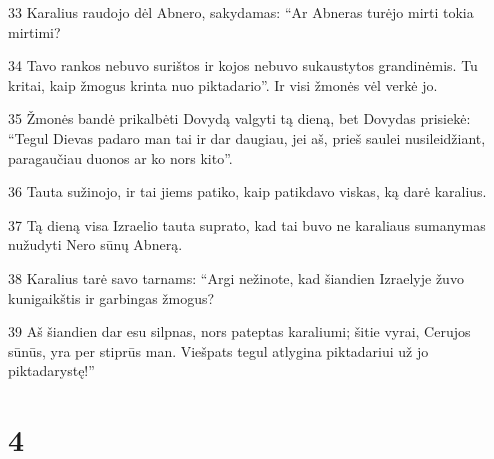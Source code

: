 \par 33 Karalius raudojo dėl Abnero, sakydamas: “Ar Abneras turėjo mirti tokia mirtimi? 
\par 34 Tavo rankos nebuvo surištos ir kojos nebuvo sukaustytos grandinėmis. Tu kritai, kaip žmogus krinta nuo piktadario”. Ir visi žmonės vėl verkė jo. 
\par 35 Žmonės bandė prikalbėti Dovydą valgyti tą dieną, bet Dovydas prisiekė: “Tegul Dievas padaro man tai ir dar daugiau, jei aš, prieš saulei nusileidžiant, paragaučiau duonos ar ko nors kito”. 
\par 36 Tauta sužinojo, ir tai jiems patiko, kaip patikdavo viskas, ką darė karalius. 
\par 37 Tą dieną visa Izraelio tauta suprato, kad tai buvo ne karaliaus sumanymas nužudyti Nero sūnų Abnerą. 
\par 38 Karalius tarė savo tarnams: “Argi nežinote, kad šiandien Izraelyje žuvo kunigaikštis ir garbingas žmogus? 
\par 39 Aš šiandien dar esu silpnas, nors pateptas karaliumi; šitie vyrai, Cerujos sūnūs, yra per stiprūs man. Viešpats tegul atlygina piktadariui už jo piktadarystę!”



\chapter{4}


